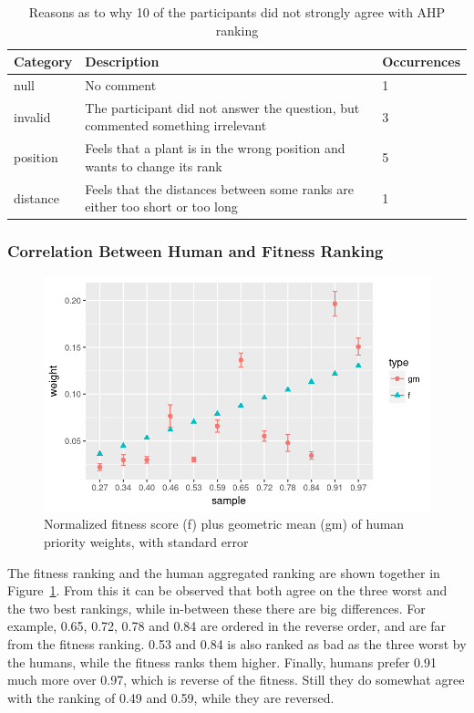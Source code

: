 \begin{table}
    \centering
    \begin{tabularx}{\textwidth}{| l | X | l |}
    \hline
    \textbf{Category} & \textbf{Description} & \textbf{Occurrences} \\ \hline
    null & No comment & 1 \\
    \hline
    invalid & The participant did not answer the question, but commented something irrelevant & 3 \\
    \hline
    position & Feels that a plant is in the wrong position and wants to change its rank & 5 \\
    \hline
    distance & Feels that the distances between some ranks are either too short or too long & 1 \\
    \hline
    \end{tabularx}
    \caption[Why AHP ranking was not perfect]{Reasons as to why 10 of the participants did not strongly agree with AHP ranking}
    \label{tab:agree-why}
\end{table}

\subsubsection{Correlation Between Human and Fitness Ranking}
\begin{figure}
    \centering
    \includegraphics[width=1.0\textwidth]{figures/weights}
    \caption[Fitness compared to human evaluation]{Normalized fitness score (f) plus geometric mean (gm) of human priority weights, with standard error}
    \label{fig:weights}
\end{figure}

The fitness ranking and the human aggregated ranking are shown together in Figure~\ref{fig:weights}.
From this it can be observed that both agree on the three worst and the two best rankings, while in-between these there are big differences.
For example, 0.65, 0.72, 0.78 and 0.84 are ordered in the reverse order, and are far from the fitness ranking.
0.53 and 0.84 is also ranked as bad as the three worst by the humans, while the fitness ranks them higher.
Finally, humans prefer 0.91 much more over 0.97, which is reverse of the fitness.
Still they do somewhat agree with the ranking of 0.49 and 0.59, while they are reversed.

